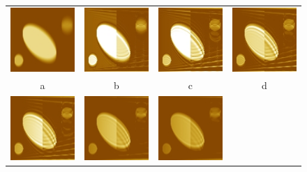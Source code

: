 \documentclass{procDDs}
\begin{document}
\begin{figure}[h!]\center%
	\begin{tabular}{cccc}
		\includegraphics[width=0.2\linewidth]{k-img-9-1.jpg}&
		\includegraphics[width=0.2\linewidth]{k-img-9-3.jpg}&
		\includegraphics[width=0.2\linewidth]{k-img-9-4.jpg}&
		\includegraphics[width=0.2\linewidth]{k-img-9-5.jpg}\\
		a & b & c & d\\
		\includegraphics[width=0.2\linewidth]{k-img-9-6.jpg}&
		\includegraphics[width=0.2\linewidth]{k-img-9-7.jpg}&
		\includegraphics[width=0.2\linewidth]{k-img-9-8.jpg}&

\end{tabular}
\end{figure}
\end{document}
